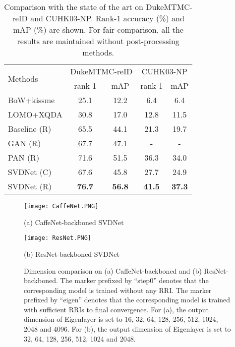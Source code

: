 \documentclass[10pt,twocolumn,letterpaper]{article}
\begin{document}
\begin{table}
\begin{center}
\begin{tabular}{l|cc|cc}
\hline
\multicolumn{1}{l|}{\multirow{2}{*}{Methods}}&\multicolumn{2}{c|}{DukeMTMC-reID}&\multicolumn{2}{c}{CUHK03-NP}\\
\cline{2-5}
\multicolumn{1}{c|}{}&rank-1&mAP&rank-1&mAP\\
\hline
BoW+kissme \cite{DBLP:conf/iccv/ZhengSTWWT15} & 25.1 & 12.2 & 6.4 & 6.4\\
LOMO+XQDA \cite{DBLP:conf/cvpr/LiaoHZL15} & 30.8 & 17.0 & 12.8 & 11.5 \\
Baseline (R) & 65.5 & 44.1 & 21.3 & 19.7 \\ 
GAN (R) \cite{zheng2017unlabeled} & {67.7}  & {47.1} & - & - \\
PAN (R) \cite{DBLP:journals/corr/PAN} & 71.6& 51.5 & 36.3 &34.0\\
\hline
SVDNet (C) &67.6&45.8 &27.7 & 24.9 \\
SVDNet (R) &\textbf{76.7}& \textbf{56.8} & \textbf{41.5} & \textbf{37.3} \\
\hline
\end{tabular}
\end{center}
\setlength{\abovecaptionskip}{0cm} 
\setlength{\belowcaptionskip}{0pt} 
\caption{Comparison with the state of the art on DukeMTMC-reID and CUHK03-NP. Rank-1 accuracy (\%) and mAP (\%) are shown. For fair comparison, all the results are maintained without post-processing methods.}
\label{table:duke}
\end{table}

\begin{figure*}[t]
\begin{minipage}[t]{0.48\linewidth}
\centering
	\texttt{[image: CaffeNet.PNG]}
\caption*{(a) CaffeNet-backboned SVDNet}
\end{minipage}
\hfill
\begin{minipage}[t]{0.48\linewidth}
\centering
	\texttt{[image: ResNet.PNG]}
\caption*{(b) ResNet-backboned SVDNet}
\end{minipage}
\setlength{\abovecaptionskip}{0cm}
\caption{Dimension comparison on (a) CaffeNet-backboned and (b) ResNet-backboned. The marker prefixed by ``step0'' denotes that the corresponding model is trained without any RRI. The marker prefixed by ``eigen'' denotes that the corresponding model is trained with sufficient RRIs to final convergence. For (a), the output dimension of Eigenlayer is set to 16, 32, 64, 128, 256, 512, 1024, 2048 and 4096. For (b), the output dimension of Eigenlayer is set to 32, 64, 128, 256, 512, 1024 and 2048.}
\label{fig:dim}
\end{figure*}
\end{document}
